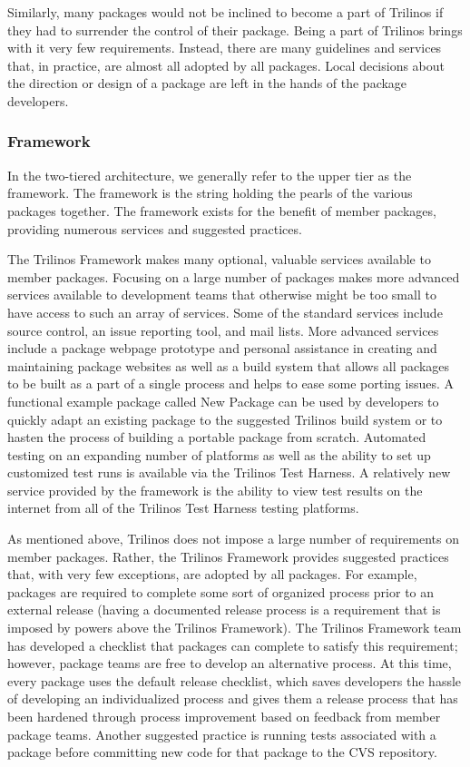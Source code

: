 \documentclass[12pt,relax]{article}
\begin{document}
  Similarly, many packages would not be inclined to become a part of Trilinos
  if they had to surrender the control of their package.  Being a part of
  Trilinos brings with it very few requirements.  Instead, there are many
  guidelines and services that, in practice, are almost all adopted by all
  packages.  Local decisions about the direction or design of a package are
  left in the hands of the package developers.

  \subsubsection{Framework}
  
  In the two-tiered architecture, we generally refer to the upper tier as the
  framework.  The framework is the string holding the pearls of the various
  packages together.  The framework exists for the benefit of member
  packages, providing numerous services and suggested practices.

  The Trilinos Framework makes many optional, valuable services available to
  member packages.  Focusing on a large number of packages makes more advanced
  services available to development teams that otherwise might be too
  small to have access to such an array of services.  Some of the standard
  services include source control, an issue reporting tool, and mail lists.
  More advanced services include a package webpage prototype and personal 
  assistance in creating and maintaining package websites as well as a build 
  system that allows all packages to be built as a part of a single process 
  and helps to ease some porting issues.  A functional example package called
  New Package can be used by developers to quickly adapt an existing package 
  to the suggested Trilinos build system or to hasten the process of 
  building a portable package from scratch.  Automated testing on an expanding 
  number of platforms as well as the ability to set up customized test runs is 
  available via the Trilinos Test Harness.  A relatively new service provided 
  by  the framework is the ability to view test results on the internet from
  all of the Trilinos Test Harness testing platforms.
  
  As mentioned above, Trilinos does not impose a large number of requirements
  on member packages.  Rather, the Trilinos Framework provides suggested 
  practices that, with very few exceptions, are adopted by all packages.
  For example, packages are required to complete some sort of organized
  process prior to an external release (having a documented release
  process is a requirement that is imposed by powers above the Trilinos
  Framework).  The Trilinos Framework team has developed a checklist that
  packages can complete to satisfy this requirement; however, package teams
  are free to develop an alternative process.  At this time, every package
  uses the default release checklist, which saves developers the hassle of
  developing an individualized process and gives them a release process that
  has been hardened through process improvement based on feedback from
  member package teams.  Another suggested practice is running tests
  associated with a package before committing new code for that package to the 
  CVS repository.
\end{document}
